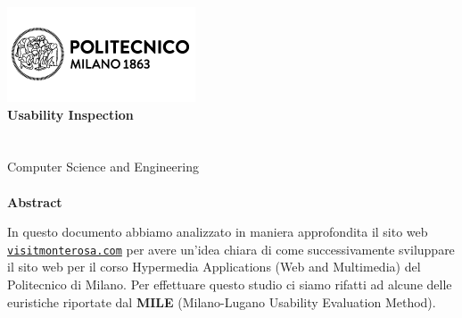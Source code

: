 \makeatletter
\begin{titlepage}
	\begin{center} 
		\includegraphics{resources/images/logo_polimi.png}\\[4ex]
		{\Huge \bfseries \sffamily Usability Inspection}\\[2ex]
		{\huge \bfseries \sffamily \@title }\\[8ex] 
		{\Large  \@author}\\[5ex] 
		Computer Science and Engineering\\[5ex]
		\@date\\[5ex]
		\fontsize{15pt}{12pt}\selectfont
		\large \textbf{Abstract}
	\end{center}
	\begin{flushleft} 
		In questo documento abbiamo analizzato in maniera approfondita il sito
		web \href{https://www.visitmonterosa.com/}{\texttt{visitmonterosa.com}}
		per avere un'idea chiara di come successivamente sviluppare il sito web
		per il corso Hypermedia Applications (Web and Multimedia) del
		Politecnico di Milano. Per effettuare questo studio ci siamo rifatti ad
		alcune delle euristiche riportate dal \textbf{MILE} (Milano-Lugano
		Usability Evaluation Method).
	\end{flushleft}
\end{titlepage}
\makeatother 
\thispagestyle{empty}
\setcounter{page}{1} %